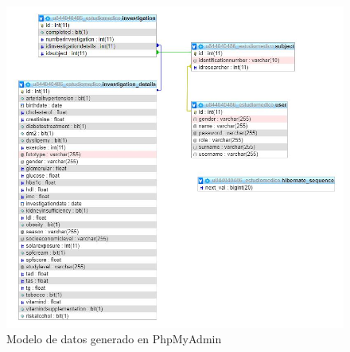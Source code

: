      \begin{figure}[h]
    \centering
     \includegraphics[width=1\textwidth]{images/modelodatos}
    \caption{Modelo de datos generado en PhpMyAdmin}
    \end{figure}
    
    
